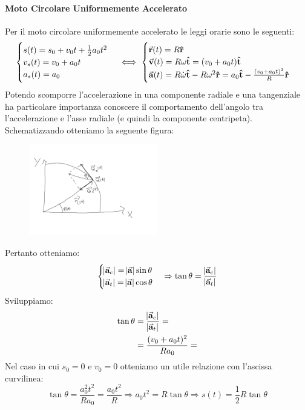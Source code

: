 \documentclass{report}
\newcommand{\then}{\ensuremath{\Rightarrow}}
\renewcommand{\a}{\va{a}}
\renewcommand{\v}{\va{v}}
\renewcommand{\r}{\va{r}}
\begin{document}
\paragraph{Moto Circolare Uniformemente Accelerato}
Per il moto circolare uniformemente accelerato le leggi orarie sono le seguenti:
\begin{equation}
\begin{cases}
    s(t)=s_0+v_0t+\frac{1}{2}a_0t^2\\
    v_s(t)=v_0+a_0t\\
    a_s(t)=a_0
\end{cases}\iff
\begin{cases}
    \r(t)=R\vu{r}\\
    \v(t)=R\omega\vu{t}=(v_0+a_0t)\vu{t}\\
    \a(t)=R\Dot{\omega}\vu{t}-R\omega^2\vu{r}=a_0\vu{t}-\frac{(v_0+a_0t)^2}{R}\vu{r}
\end{cases}
\end{equation}
Potendo scomporre l'accelerazione in una componente radiale e una tangenziale ha particolare importanza conoscere il comportamento dell'angolo tra l'accelerazione e l'asse radiale (e quindi la componente centripeta). Schematizzando otteniamo la seguente figura:
\begin{figure}[H]
    \centering
    \includegraphics[width=0.5\textwidth]{AngoloAccCirc.png}
\end{figure}
Pertanto otteniamo:
\begin{equation}
\begin{cases}
    \abs{\a_c}=\abs{\a}\sin\theta\\
    \abs{\a_t}=\abs{\a}\cos\theta
\end{cases}\then \tan\theta=\frac{\abs{\a_c}}{\abs{\a_t}}
\end{equation}
Sviluppiamo:
\begin{equation}
\begin{split}
    \tan\theta&=\frac{\abs{\a_c}}{\abs{\a_t}}=\\
    &=\frac{(v_0+a_0t)^2}{Ra_0}=\\
\end{split}
\end{equation}
Nel caso in cui $s_0=0$ e $v_0=0$ otteniamo un utile relazione con l'ascissa curvilinea:
\[\tan\theta=\frac{a_0^2t^2}{Ra_0}=\frac{a_0t^2}{R}\then a_0t^2=R\tan\theta\then s(t)=\frac{1}{2}R\tan\theta\]
\end{document}
